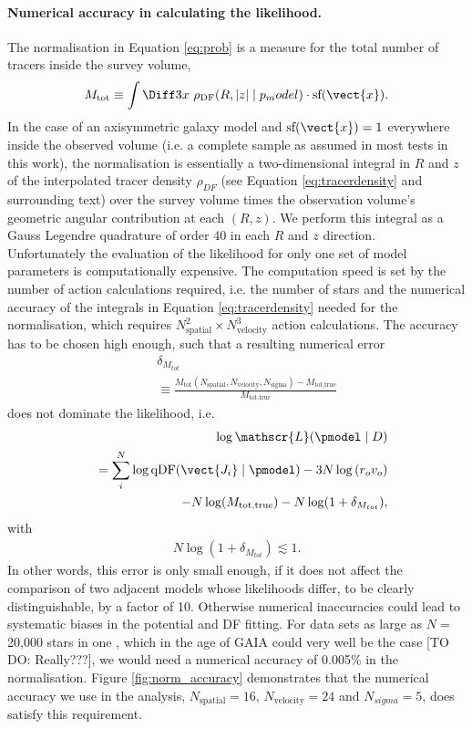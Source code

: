 \paragraph{Numerical accuracy in calculating the likelihood.} The normalisation in Equation \ref{eq:prob} is a measure for the total number of tracers inside the survey volume,
\begin{equation}
M_\text{tot} \equiv \int \Diff 3 x \  \rho_\text{DF}(R,|z| \mid p_model) \cdot \text{sf}(\vect{x}).\label{eq:normalisation}
\end{equation}
In the case of an axisymmetric galaxy model and $\text{sf}(\vect{x})=1$ everywhere inside the observed volume (i.e. a complete sample as assumed in most tests in this work), the normalisation is essentially a two-dimensional integral in $R$ and $z$ of the interpolated tracer density $\rho_{DF}$ (see Equation \ref{eq:tracerdensity} and surrounding text) over the survey volume times the observation volume's geometric angular contribution at each $(R,z)$. We perform this integral as a Gauss Legendre quadrature of order 40 in each $R$ and $z$ direction.
\\Unfortunately the evaluation of the likelihood for only one set of model parameters is computationally expensive. The computation speed is set by the number of action calculations required, i.e. the number of stars and the numerical accuracy of the integrals in Equation \ref{eq:tracerdensity} needed for the normalisation, which requires $N_\text{spatial}^2 \times N_\text{velocity}^3$ action calculations. The accuracy has to be chosen high enough, such that a resulting numerical error 
\begin{eqnarray}
&&\delta_{M_{tot}} \nonumber\\
&&\equiv \frac{M_\text{tot}(N_\text{spatial},N_\text{velocity},N_\text{sigma}) -  M_\text{tot,true} }{M_\text{tot,true}}\label{eq:relerrlikelihood}
\end{eqnarray}
does not dominate the likelihood, i.e.
\begin{eqnarray}
& &\log \mathscr{L}(\pmodel \mid D) \nonumber\\
&& = \sum_i^{N} \log \text{qDF}(\vect{J_i} \mid \pmodel) - 3N \log \left( r_o v_o\right)\nonumber\\
& & -N \log(M_\text{tot,true}) - N \log (1 + \delta_{M_{tot}}),\label{eq:loglikelihood_relerr}
\end{eqnarray}
with
\begin{eqnarray}
N \log (1 + \delta_{M_{tot}}) \lesssim 1.\nonumber
\end{eqnarray}
In other words, this error is only small enough, if it does not affect the comparison of two adjacent models whose likelihoods differ, to be clearly distinguishable, by a factor of 10. Otherwise numerical inaccuracies could lead to systematic biases in the potential and DF fitting. For data sets as large as $N =$ 20,000 stars in one \MAP{}, which in the age of GAIA could very well be the case [TO DO: Really???], we would need a numerical accuracy of 0.005\% in the normalisation. Figure \ref{fig:norm_accuracy} demonstrates that the numerical accuracy we use in the analysis, $N_\text{spatial}=16$, $N_\text{velocity}=24$ and $N_{sigma}=5$, does satisfy this requirement.

